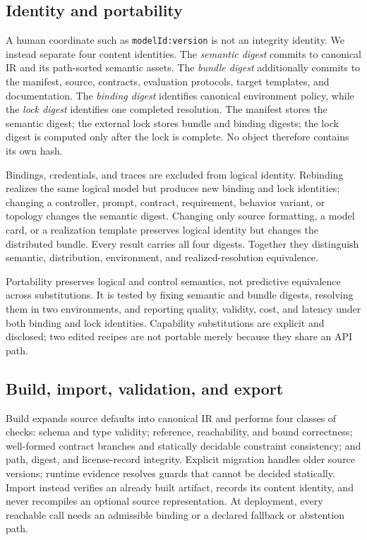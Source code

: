 \subsection{Identity and portability}

A human coordinate such as \texttt{modelId:version} is not an integrity
identity. We instead separate four content identities. The
\emph{semantic digest} commits to canonical IR and its path-sorted semantic
assets. The \emph{bundle digest} additionally commits to the manifest, source,
contracts, evaluation protocols, target templates, and documentation. The
\emph{binding digest} identifies canonical environment policy, while the
\emph{lock digest} identifies one completed resolution. The manifest stores the
semantic digest; the external lock stores
bundle and binding digests; the lock digest is computed only after the lock is
complete. No object therefore contains its own hash.

Bindings, credentials, and traces are excluded from logical identity.
Rebinding realizes the same logical model but produces new binding and lock
identities; changing a controller, prompt, contract, requirement, behavior
variant, or topology changes the semantic digest. Changing only source
formatting, a model card, or a realization template preserves logical identity
but changes the distributed bundle. Every result carries all four digests.
Together they distinguish semantic,
distribution, environment, and realized-resolution equivalence.

Portability preserves logical and control semantics, not predictive equivalence
across substitutions. It is tested by fixing semantic and bundle digests,
resolving them in two environments, and reporting quality, validity, cost, and
latency under both binding and lock identities. Capability substitutions are
explicit and disclosed; two edited recipes are not portable merely because
they share an API path.

\subsection{Build, import, validation, and export}

Build expands source defaults into canonical IR and performs four classes of
checks: schema and type validity; reference, reachability, and bound
correctness; well-formed contract branches and statically decidable constraint
consistency; and path, digest, and license-record integrity. Explicit migration
handles older source versions; runtime evidence resolves guards that cannot be
decided statically. Import instead verifies an already built artifact, records
its content identity, and never recompiles an optional source representation.
At deployment, every reachable call needs an admissible binding or a declared
fallback or abstention path.

